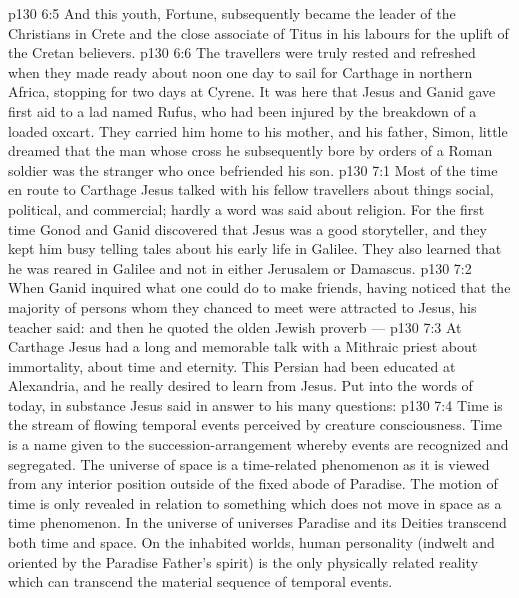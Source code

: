 \vs p130 6:5 And this youth, Fortune, subsequently became the leader of the Christians in Crete and the close associate of Titus in his labours for the uplift of the Cretan believers.
\vs p130 6:6 \pc The travellers were truly rested and refreshed when they made ready about noon one day to sail for Carthage in northern Africa, stopping for two days at Cyrene. It was here that Jesus and Ganid gave first aid to a lad named Rufus, who had been injured by the breakdown of a loaded oxcart. They carried him home to his mother, and his father, Simon, little dreamed that the man whose cross he subsequently bore by orders of a Roman soldier was the stranger who once befriended his son.
\vs p130 7:1 Most of the time en route to Carthage Jesus talked with his fellow travellers about things social, political, and commercial; hardly a word was said about religion. For the first time Gonod and Ganid discovered that Jesus was a good storyteller, and they kept him busy telling tales about his early life in Galilee. They also learned that he was reared in Galilee and not in either Jerusalem or Damascus.
\vs p130 7:2 When Ganid inquired what one could do to make friends, having noticed that the majority of persons whom they chanced to meet were attracted to Jesus, his teacher said:  and then he quoted the olden Jewish proverb --- 
\vs p130 7:3 At Carthage Jesus had a long and memorable talk with a Mithraic priest about immortality, about time and eternity. This Persian had been educated at Alexandria, and he really desired to learn from Jesus. Put into the words of today, in substance Jesus said in answer to his many questions:
\vs p130 7:4 \pc Time is the stream of flowing temporal events perceived by creature consciousness. Time is a name given to the succession\hyp{}arrangement whereby events are recognized and segregated. The universe of space is a time\hyp{}related phenomenon as it is viewed from any interior position outside of the fixed abode of Paradise. The motion of time is only revealed in relation to something which does not move in space as a time phenomenon. In the universe of universes Paradise and its Deities transcend both time and space. On the inhabited worlds, human personality (indwelt and oriented by the Paradise Father’s spirit) is the only physically related reality which can transcend the material sequence of temporal events.
